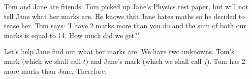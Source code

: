         
        \label{m39262*id161557}Tom and Jane are friends. Tom picked up Jane's Physics test paper, but will not tell Jane what her marks are. He knows that Jane hates maths so he decided to tease her. Tom says: 'I have 2 marks more than you do and the sum of both our marks is equal to 14. How much did we get?'\par 
        \label{m39262*id161565}Let's help Jane find out what her marks are. We have two unknowns, Tom's mark (which we shall call \begin{math}t\end{math}) and Jane's mark (which we shall call \begin{math}j\end{math}). Tom has 2 more marks than Jane. Therefore,\par 
        \label{m39262*id161587}\nopagebreak\noindent{}
    
